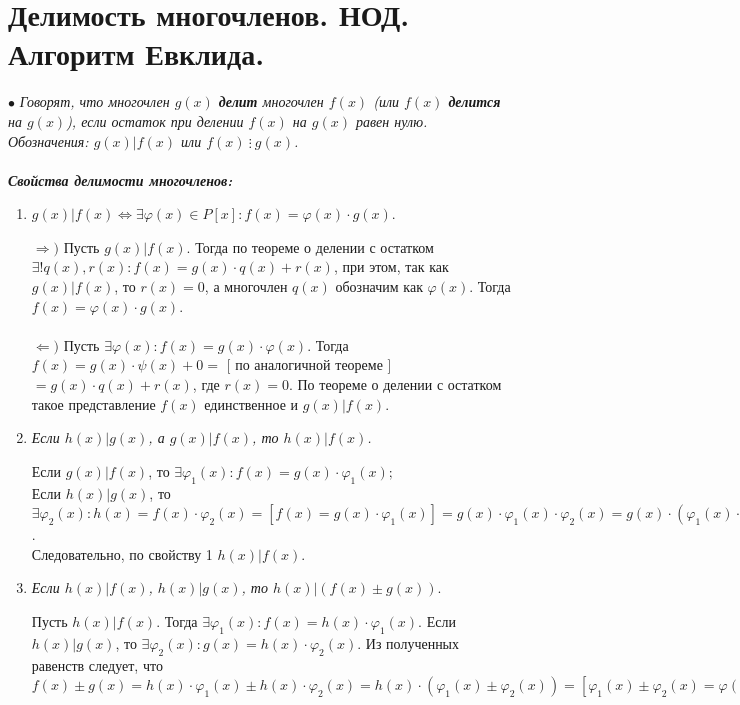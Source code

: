 \section{Делимость многочленов. НОД. Алгоритм Евклида.}
$\bullet$ \textit{Говорят, что многочлен $g(x)$ \textbf{делит} многочлен $f(x)$ (или $f(x)$ \textbf{делится} на $g(x)$), если остаток при делении $f(x)$ на $g(x)$ равен нулю. Обозначения: $g(x)|f(x)$ или $f(x)\ \vdots\ g(x)$.}\\\\
\textit{\textbf{Свойства делимости многочленов:}}\\
\begin{enumerate}
	\item  $g(x)|f(x) \Longleftrightarrow \exists \varphi(x) \in P[x]: f(x) = \varphi(x)\cdot g(x).$
	\begin{Proof} 
		$\Rightarrow )$ Пусть $g(x)|f(x)$. Тогда по теореме о делении с остатком $\exists! q(x), r(x) : f(x) = g(x)\cdot q(x) + r(x)$, при этом, так как $g(x)|f(x)$, то 
		$r(x) = 0$, а многочлен $q(x)$ обозначим как $\varphi(x)$. Тогда $f(x) = \varphi(x)\cdot g(x)$.\\\\
		$\Leftarrow)$ Пусть $\exists \varphi(x) : f(x) = g(x)\cdot \varphi(x)$. Тогда $f(x) = g(x)\cdot \psi(x) + 0 =$ [ по аналогичной теореме ] $= g(x)\cdot q(x) + r(x)$,
		где $r(x) = 0$. По теореме о делении с остатком такое представление $f(x)$ единственное и $g(x)|f(x)$.
	\end{Proof}
	\item \textit{Если $h(x)|g(x)$, а $g(x)|f(x)$, то $h(x)|f(x)$. }
	\begin{Proof} 
		Если $g(x)|f(x)$, то $\exists \varphi_1(x): f(x) = g(x)\cdot\varphi_1(x);$\\
		Если $h(x)|g(x)$, то $\exists \varphi_2(x): h(x) = f(x)\cdot\varphi_2(x) = [f(x) = g(x)\cdot\varphi_1(x)] = g(x)\cdot\varphi_1(x)\cdot\varphi_2(x) = 
		g(x)\cdot(\varphi_1(x)\cdot\varphi_2(x)) = [\varphi_1(x)\cdot\varphi_2(x) = \varphi(x)] = g(x)\cdot\varphi(x)$. \\Следовательно, по свойству 1 $h(x)|f(x).$
	\end{Proof}
	\item  \textit{Если $h(x)|f(x)$, $h(x)|g(x)$, то $h(x)|(f(x) \pm g(x)).$}
	\begin{Proof} 
		Пусть $h(x)|f(x)$. Тогда $\exists \varphi_1(x): f(x) = h(x)\cdot\varphi_1(x).$ Если $h(x)|g(x)$, то $\exists \varphi_2(x): g(x) = h(x)\cdot\varphi_2(x)$. Из полученных равенств следует, что $f(x) \pm g(x) = h(x)\cdot\varphi_1(x)\pm h(x)\cdot\varphi_2(x) = h(x)\cdot(\varphi_1(x) \pm \varphi_2(x)) = [\varphi_1(x) \pm \varphi_2(x) = \varphi(x)] = h(x)\cdot\varphi(x)\Rightarrow h(x)|(f(x) \pm g(x)).$

\end{Proof}
\end{enumerate}
